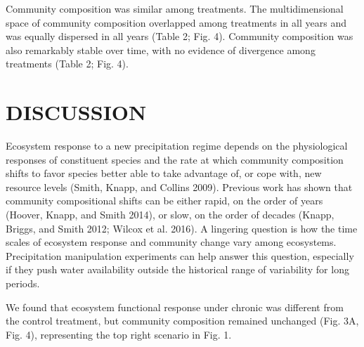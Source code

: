 \documentclass[fleqn,10pt,lineno]{wlpeerj} %
\begin{document}
Community composition was similar among treatments. The multidimensional
space of community composition overlapped among treatments in all years
and was equally dispersed in all years (Table 2; Fig. 4). Community
composition was also remarkably stable over time, with no evidence of
divergence among treatments (Table 2; Fig. 4).

\hypertarget{discussion}{%
\section{DISCUSSION}\label{discussion}}

Ecosystem response to a new precipitation regime depends on the
physiological responses of constituent species and the rate at which
community composition shifts to favor species better able to take
advantage of, or cope with, new resource levels (Smith, Knapp, and
Collins 2009). Previous work has shown that community compositional
shifts can be either rapid, on the order of years (Hoover, Knapp, and
Smith 2014), or slow, on the order of decades (Knapp, Briggs, and Smith
2012; Wilcox et al. 2016). A lingering question is how the time scales
of ecosystem response and community change vary among ecosystems.
Precipitation manipulation experiments can help answer this question,
especially if they push water availability outside the historical range
of variability for long periods.

We found that ecosystem functional response under chronic 
was different from the control treatment, but community composition
remained unchanged (Fig. 3A, Fig. 4), representing the top right
scenario in Fig. 1.
\end{document}
